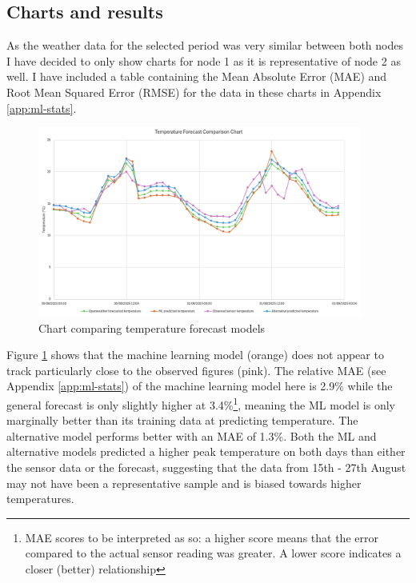 \subsection{Charts and results}

As the weather data for the selected period was very similar between both nodes
I have decided to only show charts for node 1 as it is representative of node 2
as well. I have included a table containing the Mean Absolute Error (MAE) and
Root Mean Squared Error (RMSE) for the data in these charts in Appendix
\ref{app:ml-stats}.

\begin{figure}[H]
    \centering
    \includegraphics[width=0.95\textwidth]{contents/part-4/fig4/temperature-graph.png}
    \caption{Chart comparing temperature forecast models}
    \label{fig:temperature-chart}
\end{figure}

Figure \ref{fig:temperature-chart} shows that the machine learning model
(orange) does not appear to track particularly close to the observed figures
(pink). The relative MAE (see Appendix \ref{app:ml-stats}) of the machine
learning model here is 2.9\% while the general forecast is only slightly higher
at 3.4\%\footnote{MAE scores to be interpreted as so: a higher score means that
the error compared to the actual sensor reading was greater. A lower score
indicates a closer (better) relationship}, meaning the ML model is only
marginally better than its training data at predicting temperature. The
alternative model performs better with an MAE of 1.3\%. Both the ML and
alternative models predicted a higher peak temperature on both days than either
the sensor data or the forecast, suggesting that the data from 15th - 27th
August may not have been a representative sample and is biased towards higher
temperatures.

